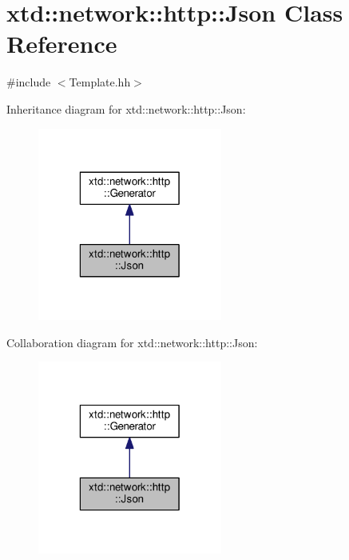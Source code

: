 \hypertarget{classxtd_1_1network_1_1http_1_1Json}{\section{xtd\-:\-:network\-:\-:http\-:\-:Json Class Reference}
\label{classxtd_1_1network_1_1http_1_1Json}
}


{\ttfamily \#include $<$Template.\-hh$>$}



Inheritance diagram for xtd\-:\-:network\-:\-:http\-:\-:Json\-:
\nopagebreak
\begin{figure}[H]
\begin{center}
\leavevmode
\includegraphics[width=172pt]{classxtd_1_1network_1_1http_1_1Json__inherit__graph}
\end{center}
\end{figure}


Collaboration diagram for xtd\-:\-:network\-:\-:http\-:\-:Json\-:
\nopagebreak
\begin{figure}[H]
\begin{center}
\leavevmode
\includegraphics[width=172pt]{classxtd_1_1network_1_1http_1_1Json__coll__graph}
\end{center}
\end{figure}
